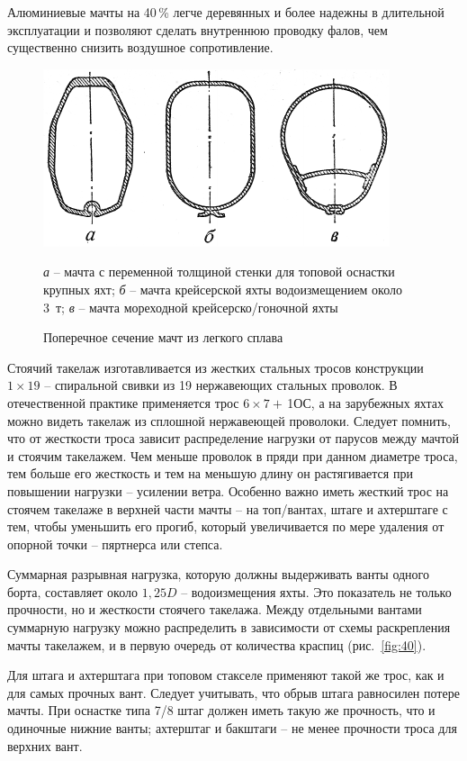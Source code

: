 \documentclass[a4paper, 12pt, twoside, final, book, russian, fittopage, cyremdash]{ncc}
\newcommand{\ris}[1]{\ref{fig:#1}}
\begin{document}
Алюминиевые мачты на 40\,\% легче деревянных и более надежны в длительной эксплуатации и позволяют сделать внутреннюю проводку фалов, чем существенно снизить воздушное сопротивление.

\begin{figure}[htb]
  \centering{}
  \includegraphics[scale=1.2]{0039P}
  \caption{Поперечное сечение мачт из легкого сплава}
  \label{fig:39}
  \centering{}
  \small
  \textit{а} \--- мачта с переменной толщиной стенки для топовой оснастки крупных яхт; \textit{б} \--- мачта крейсерской яхты водоизмещением около 3~т; \textit{в} \--- мачта мореходной крейсерско\-/гоночной яхты
\end{figure}

Стоячий такелаж изготавливается из жестких стальных тросов конструкции $1 \times 19$ \--- спиральной свивки из 19 нержавеющих стальных проволок. В отечественной практике применяется трос $6 \times 7 + $\,1ОС, а на зарубежных яхтах можно видеть такелаж из сплошной нержавеющей проволоки. Следует помнить, что от жесткости троса зависит распределение нагрузки от парусов между мачтой и стоячим такелажем. Чем меньше проволок в пряди при данном диаметре троса, тем больше его жесткость и тем на меньшую длину он растягивается при повышении нагрузки \--- усилении ветра. Особенно важно иметь жесткий трос на стоячем такелаже в верхней части мачты \--- на топ\-/вантах, штаге и ахтерштаге с тем, чтобы уменьшить его прогиб, который увеличивается по мере удаления от опорной точки \--- пяртнерса или степса. 

Суммарная разрывная нагрузка, которую должны выдерживать ванты одного борта, составляет около $1,25D$ \--- водоизмещения яхты. Это показатель не только прочности, но и жесткости стоячего такелажа. Между отдельными вантами суммарную нагрузку можно распределить в зависимости от схемы раскрепления мачты такелажем, и в первую очередь от количества краспиц (рис.~\ris{40}). 

Для штага и ахтерштага при топовом стакселе применяют такой же трос, как и для самых прочных вант. Следует учитывать, что обрыв штага равносилен потере мачты. При оснастке типа 7/8 штаг должен иметь такую же прочность, что и одиночные нижние ванты; ахтерштаг и бакштаги \--- не менее прочности троса для верхних вант. 
\end{document}
